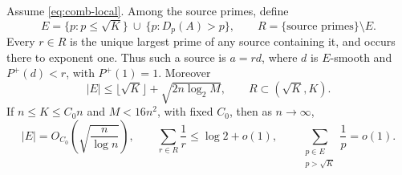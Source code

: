 \begin{theorem}
\label{thm:comb-core}
Assume \eqref{eq:comb-local}. Among the source primes, define
\[
 E=\{p:p\le\sqrt K\}\ \cup\ \{p:D_p(A)>p\},
 \qquad R=\{\text{source primes}\}\setminus E.
\]
Every $r\in R$ is the unique largest prime of any source containing
it, and occurs there to exponent one. Thus such a source is $a=rd$,
where $d$ is $E$-smooth and $P^+(d)<r$, with $P^+(1)=1$.
Moreover
\begin{equation}
 |E|\le\lfloor\sqrt K\rfloor+\sqrt{2n\log_2M},
 \qquad R\subset(\sqrt K,K).
 \label{eq:comb-core-elementary}
\end{equation}
If $n\le K\le C_0n$ and $M<16n^2$, with fixed $C_0$, then as
$n\to\infty$,
\begin{equation}
 |E|=O_{C_0}\!\left(\sqrt{\frac n{\log n}}\right),\qquad
 \sum_{r\in R}\frac1r\le\log2+o(1),\qquad
 \sum_{\substack{p\in E\\p>\sqrt K}}\frac1p=o(1).
 \label{eq:comb-core-sharp}
\end{equation}
\end{theorem}

